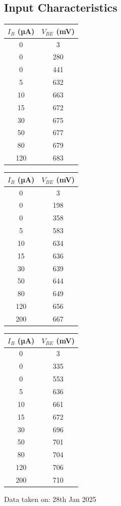 \documentclass[%
sor,
 jor,
 amsmath,amssymb,
 reprint,
]{revtex4-2}
\begin{document}
\subsection{Input Characteristics}
\begin{center}
\begin{minipage}{0.31\linewidth}
\centering
{}
\begin{tabular}{|c|c|}
\hline
$I_B$ (µA) & $V_{BE}$ (mV) \\
\hline
0 & 3   \\
0 & 280 \\
0 & 441 \\
5 & 632 \\
10 & 663 \\
15 & 672 \\
30 & 675 \\
50 & 677 \\
80 & 679 \\
120 & 683 \\
\hline
\end{tabular}
\end{minipage}
\begin{minipage}{0.32\linewidth}
	\centering
\begin{tabular}{|c|c|}
\hline
$I_B$ (µA) & $V_{BE}$ (mV) \\
\hline
0 & 3   \\
0 & 198 \\
0 & 358 \\
5 & 583 \\
10 & 634 \\
15 & 636 \\
30 & 639 \\
50 & 644 \\
80 & 649 \\
120 & 656 \\
200 & 667 \\
\hline
\end{tabular}
\end{minipage}
\hfill
\begin{minipage}{0.34\linewidth}
\centering
{}
\begin{tabular}{|c|c|}
\hline
$I_B$ (µA) & $V_{BE}$ (mV)\\
\hline
0 & 3   \\
0 & 335 \\
0 & 553 \\
5 & 636 \\
10 & 661 \\
15 & 672 \\
30 & 696 \\
50 & 701 \\
80 & 704 \\
120 & 706 \\
200 & 710 \\
\hline
\end{tabular}
\end{minipage}
\end{center}
\begin{center}
Data taken on: 28th Jan 2025 
\end{center}
\end{document}
